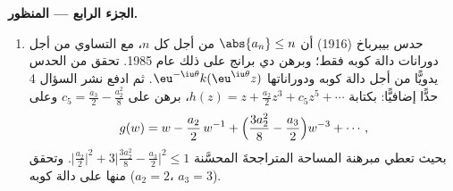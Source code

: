 \begin{problem}
\medskip
\noindent\textbf{الجزء الرابع --- المنظور.}
\begin{enumerate}[resume]
  \item حدس بيبرباخ (1916) أن $\abs{a_n} \leq n$ من أجل كل $n$، مع
        التساوي من أجل دورانات دالة كوبه فقط؛ وبرهن دي برانج
        على ذلك عام 1985. تحقق من الحدس يدويًّا من أجل دالة
        كوبه ودوراناتها $\eu^{-\iu\theta}k(\eu^{\iu\theta}z)$. ثم ادفع نشر السؤال 4 حدًّا
        إضافيًّا: بكتابة $h(z) = z + \frac{a_2}2z^3 + c_5z^5 + \cdots$، برهن على $c_5 = \frac{a_3}2 - \frac{a_2^2}8$ وعلى
        \[
        g(w) = w - \frac{a_2}{2}\,w^{-1} +
        \Bigl(\frac{3a_2^2}8 - \frac{a_3}2\Bigr)w^{-3} +
        \cdots ,
        \]
        بحيث تعطي مبرهنة المساحة المتراجحةَ المحسَّنة $\bigl|\frac{a_2}2\bigr|^2 + 3\bigl|\frac{3a_2^2}8 -
        \frac{a_3}2\bigr|^2 \leq 1$.
        وتحقق منها على دالة كوبه ($a_2 = 2$، $a_3 = 3$).
\end{enumerate}


\end{problem}
